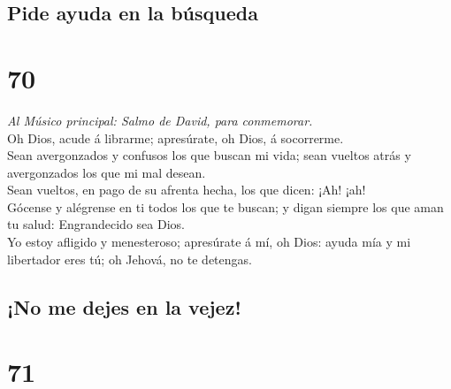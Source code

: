 \hypertarget{pide-ayuda-en-la-buxfasqueda}{%
\subsection{Pide ayuda en la
búsqueda}\label{pide-ayuda-en-la-buxfasqueda}}

\hypertarget{section-69}{%
\section{70}\label{section-69}}

 \emph{Al Músico principal: Salmo de David, para
conmemorar.}\\
Oh Dios, acude á librarme; apresúrate, oh Dios, á socorrerme.\\
 Sean avergonzados y confusos los que buscan mi vida; sean
vueltos atrás y avergonzados los que mi mal desean.\\
 Sean vueltos, en pago de su afrenta hecha, los que dicen:
¡Ah! ¡ah!\\
 Gócense y alégrense en ti todos los que te buscan; y digan
siempre los que aman tu salud: Engrandecido sea Dios.\\
 Yo estoy afligido y menesteroso; apresúrate á mí, oh Dios:
ayuda mía y mi libertador eres tú; oh Jehová, no te detengas.

\hypertarget{no-me-dejes-en-la-vejez}{%
\subsection{¡No me dejes en la vejez!}\label{no-me-dejes-en-la-vejez}}

\hypertarget{section-70}{%
\section{71}\label{section-70}}

